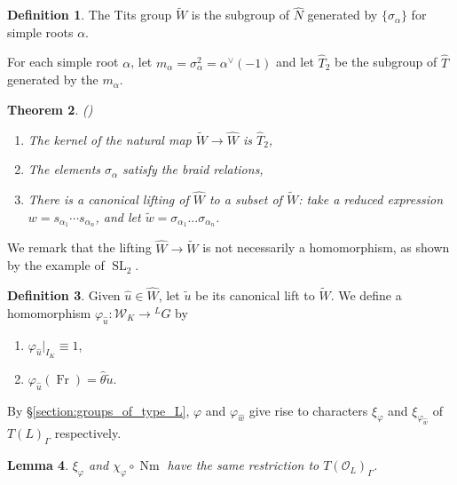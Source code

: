 \documentclass{compositio}
\theoremstyle{plain}
\newtheorem{theorem}{Theorem}[section]
\newtheorem{lemma}[theorem]{Lemma}
\theoremstyle{definition}
\newtheorem{definition}[theorem]{Definition}
\numberwithin{equation}{section}
\DeclareMathOperator{\Nm}{Nm}
\DeclareMathOperator{\Fr}{Fr}
\DeclareMathOperator{\SL}{SL}
\newcommand{\OL}{\mathcal{O}_L}
\newcommand{\Weil}{\mathcal{W}}
\begin{document}
\begin{definition}
  The Tits group $\widetilde{W}$ is the subgroup of $\hat{N}$
  generated by $\{\sigma_{\alpha} \}$ for simple roots $\alpha$.
\end{definition}

For each simple root $\alpha$, let $m_{\alpha} = \sigma_{\alpha}^2 = \alpha^{\vee}(-1)$ and
let $\hat{T}_2$ be the subgroup of $\hat{T}$ generated by the $m_{\alpha}$.

\begin{theorem}{(\cite{tits:66a})}
\begin{enumerate}

\item The kernel of the natural map $\widetilde{W} \rightarrow \hat{W}$
  is $\hat{T}_2$,
\item The elements $\sigma_{\alpha}$ satisfy the braid relations,
\item There is a canonical lifting of $\hat{W}$ to a subset of
  $\widetilde{W}$: take a reduced expression $w = s_{\alpha_1} \cdots s_{\alpha_n}$,
  and let $\tilde{w} = \sigma_{\alpha_1} ... \sigma_{\alpha_n}$.
\end{enumerate}
\end{theorem}

We remark that the lifting $\hat{W} \rightarrow \widetilde{W}$ is not necessarily a homomorphism,
as shown by the example of $\SL_2$.

\begin{definition} \label{def:phiu}
Given $\hat{u} \in \hat{W}$, let $\tilde{u}$ be its canonical lift to $\widetilde{W}$.
We define a homomorphism $\varphi_{\hat{u}} : \Weil_K \rightarrow {}^L G$ by
\begin{enumerate}
\item $\varphi_{\hat{u}}|_{I_K} \equiv 1$,
\item $\varphi_{\hat{u}}(\Fr) = \hat{\theta} \tilde{u}$.
\end{enumerate}
\end{definition}

By
\S\ref{section:groups_of_type_L}, $\varphi$ and $\varphi_{\hat{w}}$ give rise to characters
$\xi_{\varphi}$ and $\xi_{\varphi_{\hat{w}}}$ of $T(L)_{\Gamma}$ respectively.

\begin{lemma} \label{lem:GDR_compat}
$\xi_{\varphi}$ and $\chi_{\varphi} \circ \Nm$ have the same restriction to $T(\OL)_{\Gamma}$.
\end{lemma}
\end{document}
